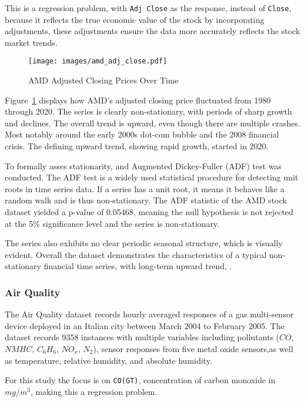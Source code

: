 \documentclass[conference]{IEEEtran}
\begin{document}
This is a regression problem, with \texttt{Adj Close} as the response, instead of \texttt{Close}, because it reflects the true economic value of the stock by incorporating adjustments, these adjustments ensure the data more accurately reflects the stock market trends.

\begin{figure}[H]
    \centering
    \texttt{[image: images/amd\_adj\_close.pdf]}
    \caption{AMD Adjusted Closing Prices Over Time}
    \label{fig:amd_adj_close}
\end{figure}

Figure~\ref{fig:amd_adj_close} displays how AMD's adjusted closing price fluctuated from 1980 through 2020. The series is clearly non-stationary, with periods of sharp growth and declines. The overall trend is upward, even though there are multiple crashes. Most notably around the early 2000s dot-com bubble and the 2008 financial crisis. The defining upward trend, showing rapid growth, started in 2020.

To formally asses stationarity, and Augmented Dickey-Fuller (ADF) test was conducted. The ADF test is a widely used statistical procedure for detecting unit roots in time series data. If a series has a unit root, it means it behaves like a random walk and is thus non-stationary. The ADF statistic of the AMD stock dataset yielded a p-value of 0.05468, meaning the null hypothesis is not rejected at the 5\% significance level and the series is non-stationary.

The series also exhibits no clear periodic seasonal structure, which is visually evident. Overall the dataset demonstrates the characteristics of a typical non-stationary financial time series, with long-term upward trend, \cite{stock_market_dataset_amd}.

\subsubsection{\textbf{Air Quality}}

The Air Quality dataset records hourly averaged responses of a gas multi-sensor device deployed in an Italian city between March 2004 to February 2005. The dataset records 9358 instances with multiple variables including pollutants ($CO$, $NMHC$, $C_6H_6$, $NO_x$, $N_2$), sensor responses from five metal oxide sensors,as well as temperature, relative humidity, and absolute humidity.

For this study the focus is on \texttt{CO(GT)}, concentration of carbon monoxide in $mg/m^3$, making this a regression problem.
\end{document}
